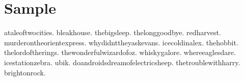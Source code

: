 \documentclass[12pt,a4paper]{article}
\begin{document}
\section{Sample}

\gls{ataleoftwocities}. \gls{bleakhouse}. \gls{thebigsleep}.
\gls{thelonggoodbye}. \gls{redharvest}.
\gls{murderontheorientexpress}. \gls{whydidnttheyaskevans}.
\gls{icecoldinalex}. \gls{thehobbit}. \gls{thelordoftherings}.
\gls{thewonderfulwizardofoz}. \gls{whiskygalore}.
\gls{whereeaglesdare}. \gls{icestationzebra}. \gls{ubik}.
\gls{doandroidsdreamofelectricsheep}. \gls{thetroublewithharry}.
\gls{brightonrock}.

\printunsrtglossary[title={Author and Book List}]
\end{document}
